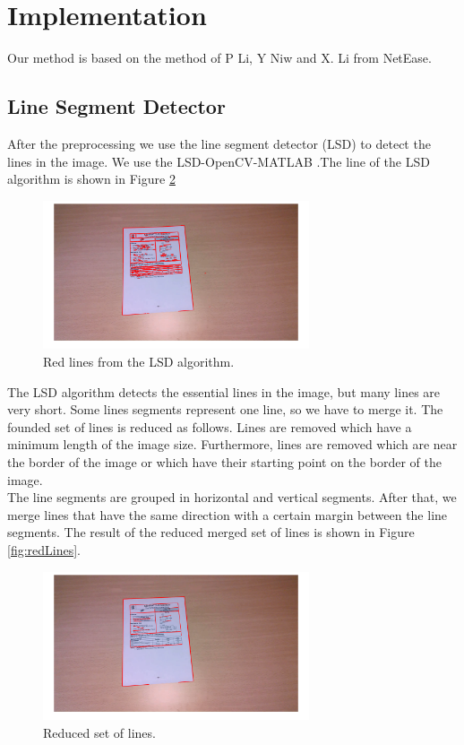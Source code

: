 \documentclass[english, paper=a4]{scrartcl}
\begin{document}
\section{Implementation}
Our method is based on the method of P Li, Y Niw and X. Li from NetEase.



\subsection{Line Segment Detector}
After the preprocessing we use the line segment detector (LSD) \cite{von2010lsd} to detect the lines in the image. We use the LSD-OpenCV-MATLAB \cite{lsd2014}.The line of the LSD algorithm is shown in Figure \ref{fig:lsd}

\begin{figure}[h]
\centering
\includegraphics[width=0.7\textwidth]{lsd.png}
\caption{Red lines from the LSD algorithm.}
\label{fig:lsd}
\end{figure}

The LSD algorithm detects the essential lines in the image, but many lines are very short. Some lines segments represent one line, so we have to merge it. The founded set of lines is reduced as follows. Lines are removed which have a minimum length of the image size. Furthermore, lines are removed which are near the border of the image or which have their starting point on the border of the image.\\
The line segments are grouped in horizontal and vertical segments. After that, we merge lines that have the same direction with a certain margin between the line segments.
The result of the reduced merged set of lines is shown in Figure \ref{fig:redLines}.

\begin{figure}[h]
\centering
\includegraphics[width=0.7\textwidth]{redLines.png}
\caption{Reduced set of lines.}
\label{fig:lsd}
\end{figure}
\end{document}
